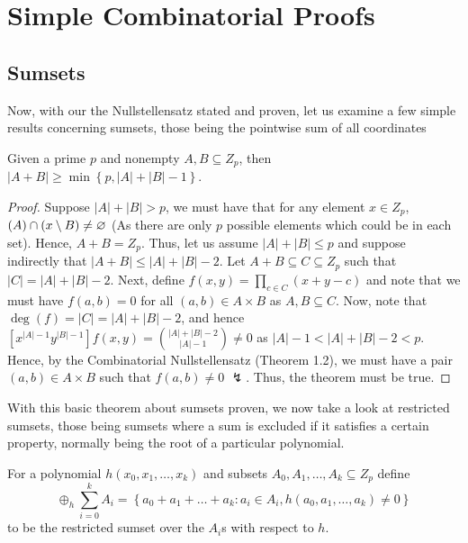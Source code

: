 \chapter{Simple Combinatorial Proofs}
\section{Sumsets} Now, with our the Nullstellensatz stated and proven, let us examine a few simple results concerning sumsets, those being the pointwise sum of all coordinates
\begin{theorem} Given a
	prime $p$ and nonempty $A,B \subseteq Z_{p}$, then $\left| A + B
	\right| \ge \min \left\{ p, \left| A \right|  + \left| B \right|  -1
	\right\} $.  \end{theorem} \begin{proof}[Proof] Suppose $\left| A
	\right| + \left| B \right| > p$, we must have that for any element $x
	\in Z_p$, $\left( A \right) \cap \left( x \setminus B \right) \neq \varnothing$
	(As there are only $p$ possible elements which could be in each set).
	Hence, $A + B = Z_p$. Thus, let us assume $\left| A \right|  + \left| B
	\right| \le p$ and suppose indirectly that $\left| A+B \right| \le
	\left| A \right| + \left| B \right| -2$. Let $A+B \subseteq C \subseteq
	Z_p$ such that $\left| C \right| = \left| A \right|  + \left| B \right|
	-2$. Next, define $f\left( x,y \right)  = \prod_{c \in C}^{} \left( x +
	y - c \right) $ and note that we must have $f\left( a,b \right)  = 0$
	for all $\left( a,b \right)  \in A \times B$ as $A,B \subseteq C$. Now, note
	that $\deg \left( f \right) = \left| C \right| = \left| A \right|  +
	\left| B \right|  -2$, and hence $[x^{\left| A \right| -1}y ^{\left| B
	\right| -1}]f\left( x,y \right) = \binom{\left| A \right| + \left| B
\right|  -2}{\left| A \right| -1} \neq 0$ as $\left| A \right| -1 < \left| A
\right|  + \left| B \right| -2 < p$. Hence, by the Combinatorial
Nullstellensatz (Theorem 1.2), we must have a pair $\left( a,b \right)  \in A
\times B$ such that $f\left( a,b \right) \neq 0$ $\lightning$. Thus, the theorem must be true.
\end{proof} With this basic theorem about
sumsets proven, we now take a look at restricted sumsets, those being sumsets
where a sum is excluded if it satisfies a certain property, normally being the
root of a particular polynomial.  \begin{notation} For a
	polynomial $h \left( x_0, x_1, \ldots, x_{k} \right) $ and subsets
	$A_0, A_1, \ldots, A_{k} \subseteq Z_p$ define \[ \oplus _h
	\sum_{i=0}^{k} A_{i} = \left\{ a_0 + a_1 + \ldots + a_{k} : a_{i} \in
A_{i}, h\left( a_0, a_1, \ldots, a_{k} \right) \neq 0 \right\} \] to be the
restricted sumset over the $A_{i}$s with respect to $h$.  \end{notation}
